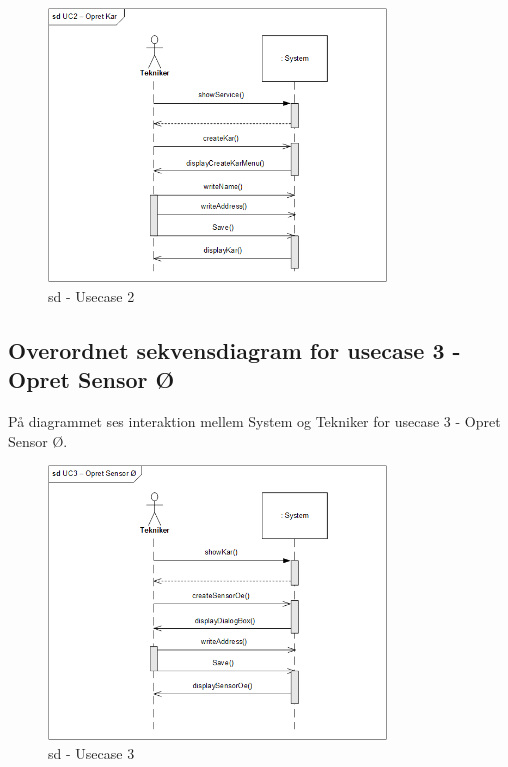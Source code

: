 \begin{figure}[H]
    \centering
    \includegraphics[width=0.8\textwidth]{Systemarkitektur/OverordnedeSekvensdiagrammer/sd_UC2.PNG}
    \caption{sd - Usecase 2}
    \label{fig:sd_UC2}
\end{figure}


\subsection*{Overordnet sekvensdiagram for usecase 3 - Opret Sensor Ø}
På diagrammet ses interaktion mellem System og Tekniker for usecase 3 - Opret Sensor Ø.

\begin{figure}[H]
    \centering
    \includegraphics[width=0.8\textwidth]{Systemarkitektur/OverordnedeSekvensdiagrammer/sd_UC3.PNG}
    \caption{sd - Usecase 3}
    \label{fig:sd_UC3}
\end{figure}

